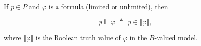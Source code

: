 If $p \in P$ and $\varphi$ is a formula (limited or unlimited), then

$$
p \Vdash \varphi \;\triangleq\; p \in \llbracket \varphi \rrbracket,
$$

where $\llbracket \varphi \rrbracket$ is the Boolean truth value of $\varphi$ in the $B$-valued model.

